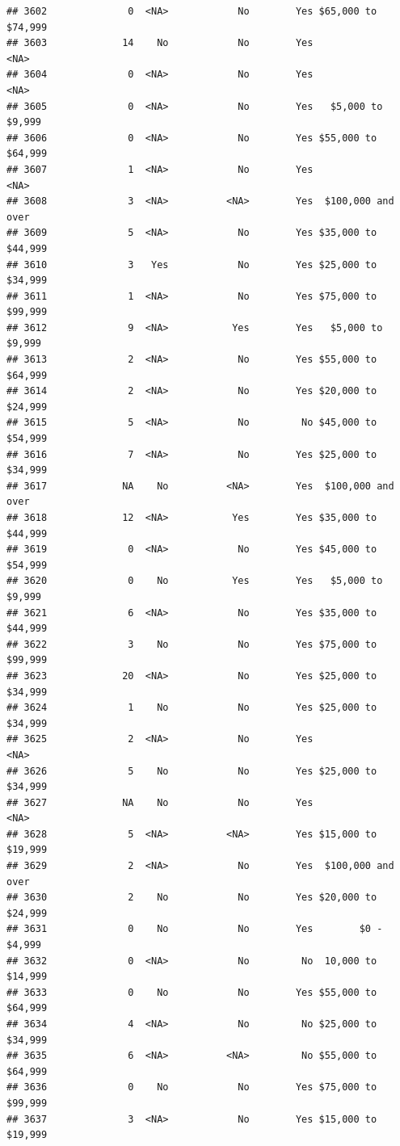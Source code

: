 \documentclass[man]{apa6}
\begin{document}
\begin{verbatim}
## 3602              0  <NA>            No        Yes $65,000 to $74,999
## 3603             14    No            No        Yes               <NA>
## 3604              0  <NA>            No        Yes               <NA>
## 3605              0  <NA>            No        Yes   $5,000 to $9,999
## 3606              0  <NA>            No        Yes $55,000 to $64,999
## 3607              1  <NA>            No        Yes               <NA>
## 3608              3  <NA>          <NA>        Yes  $100,000 and over
## 3609              5  <NA>            No        Yes $35,000 to $44,999
## 3610              3   Yes            No        Yes $25,000 to $34,999
## 3611              1  <NA>            No        Yes $75,000 to $99,999
## 3612              9  <NA>           Yes        Yes   $5,000 to $9,999
## 3613              2  <NA>            No        Yes $55,000 to $64,999
## 3614              2  <NA>            No        Yes $20,000 to $24,999
## 3615              5  <NA>            No         No $45,000 to $54,999
## 3616              7  <NA>            No        Yes $25,000 to $34,999
## 3617             NA    No          <NA>        Yes  $100,000 and over
## 3618             12  <NA>           Yes        Yes $35,000 to $44,999
## 3619              0  <NA>            No        Yes $45,000 to $54,999
## 3620              0    No           Yes        Yes   $5,000 to $9,999
## 3621              6  <NA>            No        Yes $35,000 to $44,999
## 3622              3    No            No        Yes $75,000 to $99,999
## 3623             20  <NA>            No        Yes $25,000 to $34,999
## 3624              1    No            No        Yes $25,000 to $34,999
## 3625              2  <NA>            No        Yes               <NA>
## 3626              5    No            No        Yes $25,000 to $34,999
## 3627             NA    No            No        Yes               <NA>
## 3628              5  <NA>          <NA>        Yes $15,000 to $19,999
## 3629              2  <NA>            No        Yes  $100,000 and over
## 3630              2    No            No        Yes $20,000 to $24,999
## 3631              0    No            No        Yes        $0 - $4,999
## 3632              0  <NA>            No         No  10,000 to $14,999
## 3633              0    No            No        Yes $55,000 to $64,999
## 3634              4  <NA>            No         No $25,000 to $34,999
## 3635              6  <NA>          <NA>         No $55,000 to $64,999
## 3636              0    No            No        Yes $75,000 to $99,999
## 3637              3  <NA>            No        Yes $15,000 to $19,999

\end{verbatim}
\end{document}

